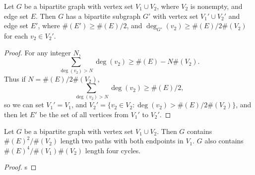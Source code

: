 \begin{theorem}
	Let $G$ be a bipartite graph with vertex set $V_1 \cup V_2$, where $V_2$ is nonempty, and edge set $E$. Then $G$ has a bipartite subgraph $G'$ with vertex set $V_1' \cup V_2'$ and edge set $E'$, where $\#(E') \geq \#(E)/2$, and $\deg_{G'}(v_2) \geq \#(E)/2\#(V_2)$ for each $v_2 \in V_2'$.
\end{theorem}
\begin{proof}
	For any integer $N$,
	\[ \sum_{\deg(v_2) > N} \deg(v_2) \geq \#(E) - N \#(V_2). \]	
	Thus if $N = \#(E) / 2 \#(V_2)$,
	\[ \sum_{\deg(v_2) > N} \deg(v_2) \geq \#(E)/2, \]
	so we can set $V_1' = V_1$, and $V_2' = \{ v_2 \in V_2: \deg(v_2) > \#(E)/2\#(V_2) \}$, and then let $E'$ be the set of all vertices from $V_1'$ to $V_2'$.
\end{proof}

\begin{theorem}
	Let $G$ be a bipartite graph with vertex set $V_1 \cup V_2$. Then $G$ contains $\#(E)^2/\#(V_2)$ length two paths with both endpoints in $V_1$. $G$ also contains $\#(E)^4/\#(V_1) \#(V_2)$ length four cycles.
\end{theorem}
\begin{proof}
	s
\end{proof}

 